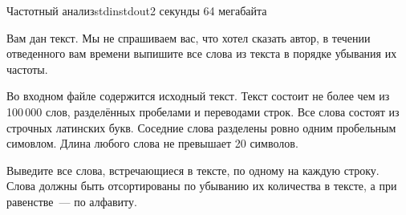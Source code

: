 \begin{problem}{Частотный анализ}{stdin}{stdout}{2 секунды}
{64 мегабайта}

Вам дан текст. Мы не спрашиваем вас, что хотел сказать автор, в течении отведенного вам времени выпишите все слова из текста в порядке убывания их частоты.

\InputFile
Во входном файле содержится исходный текст. Текст состоит не более чем из 100\,000 слов, разделённых пробелами и переводами строк. Все слова состоят из строчных латинских букв.
Соседние слова разделены ровно одним пробельным симовлом. Длина любого слова не превышает 20 символов.

\OutputFile
Выведите все слова, встречающиеся в тексте, по одному на каждую строку. Слова должны быть отсортированы по убыванию их количества в тексте, а при равенстве~--- по алфавиту.

\Examples

\begin{example}
%
%
\end{example}

\end{problem}

